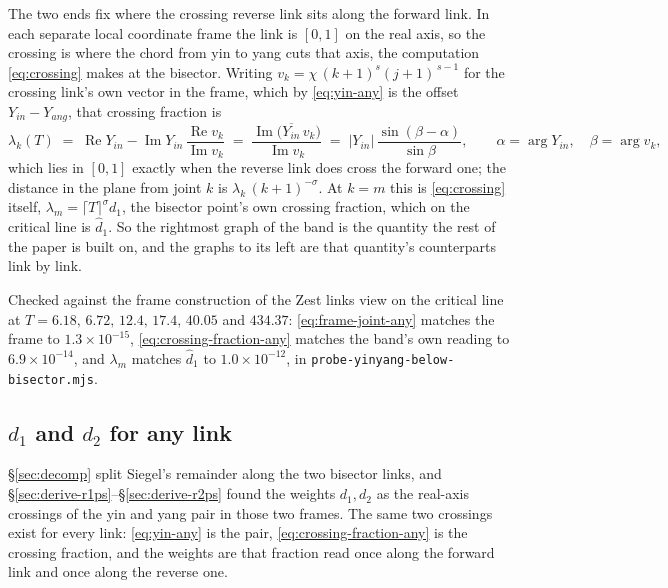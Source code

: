 \documentclass[11pt]{article}
\theoremstyle{definition}
\begin{document}
The two ends fix where the crossing reverse link sits along the forward link. In each separate local coordinate frame the link
is $[0,1]$ on the real axis, so the crossing is where the chord from yin to
yang cuts that axis, the computation \eqref{eq:crossing} makes at the bisector.
Writing $v_k=\chi\,(k+1)^{s}(j+1)^{\,s-1}$ for the crossing link's own vector in
the frame, which by \eqref{eq:yin-any} is the offset $Y_{in}-Y_{ang}$, that
crossing fraction is
\begin{equation}\label{eq:crossing-fraction-any}
\lambda_k(T)
\;=\;\operatorname{Re}Y_{in}-\operatorname{Im}Y_{in}\,
\frac{\operatorname{Re}v_k}{\operatorname{Im}v_k}
\;=\;\frac{\operatorname{Im}\bigl(\overline{Y_{in}}\,v_k\bigr)}{\operatorname{Im}v_k}
\;=\;\bigl|Y_{in}\bigr|\,\frac{\sin(\beta-\alpha)}{\sin\beta},
\qquad
\alpha=\arg Y_{in},\quad \beta=\arg v_k,
\end{equation}
which lies in $[0,1]$ exactly when the reverse link does cross the forward one;
the distance in the plane from joint $k$ is $\lambda_k\,(k+1)^{-\sigma}$. At
$k=m$ this is \eqref{eq:crossing} itself, $\lambda_m=\lceil T\rceil^{\sigma}d_1$,
the bisector point's own crossing fraction, which on the critical line is
$\hat d_1$. So the rightmost graph of the band is the quantity the rest of the
paper is built on, and the graphs to its left are that quantity's counterparts
link by link.

Checked against the frame construction of the Zest links view on the critical
line at $T=6.18,\,6.72,\,12.4,\,17.4,\,40.05$ and $434.37$:
\eqref{eq:frame-joint-any} matches the frame to $1.3\times10^{-15}$,
\eqref{eq:crossing-fraction-any} matches the band's own reading to
$6.9\times10^{-14}$, and $\lambda_m$ matches $\hat d_1$ to $1.0\times10^{-12}$,
in \texttt{probe-yinyang-below-bisector.mjs}.

\subsection{\texorpdfstring{$d_1$ and $d_2$}{d1 and d2} for any link}\label{sec:d1-any}

\S\ref{sec:decomp} split Siegel's remainder along the two bisector links,
and \S\ref{sec:derive-r1ps}--\S\ref{sec:derive-r2ps} found the weights
$d_1,d_2$ as the real-axis crossings of the yin and yang pair in those two
frames. The same two crossings exist for every link: \eqref{eq:yin-any} is
the pair, \eqref{eq:crossing-fraction-any} is the crossing fraction, and the
weights are that fraction read once along the forward link and once along the
reverse one.
\end{document}
